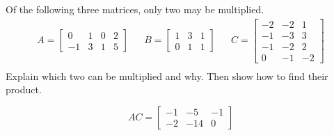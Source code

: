 
\begin{exerciseStatement}


Of the following three matrices, only two may be multiplied. 
\begin{align*} A= \left[\begin{array}{cccc}
0 & 1 & 0 & 2 \\
-1 & 3 & 1 & 5
\end{array}\right]  & & B= \left[\begin{array}{ccc}
1 & 3 & 1 \\
0 & 1 & 1
\end{array}\right]  & & C= \left[\begin{array}{ccc}
-2 & -2 & 1 \\
-1 & -3 & 3 \\
-1 & -2 & 2 \\
0 & -1 & -2
\end{array}\right]  \\ \end{align*}
             Explain which two can be multiplied and why. Then show how to find their product.


\end{exerciseStatement}
    
\begin{exerciseAnswer} 
\[AC= \left[\begin{array}{ccc}
-1 & -5 & -1 \\
-2 & -14 & 0
\end{array}\right] \]
\end{exerciseAnswer}
    
